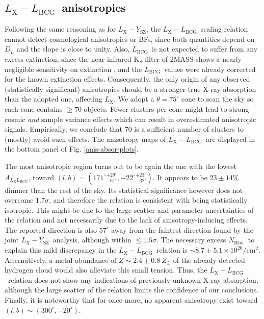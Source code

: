 \documentclass{aa}   %
\newcommand{\LY}{$L_{\text{X}}-Y_{\text{SZ}}$}
\newcommand{\LxLbcg}{$L_{\text{X}}-L_{\text{BCG}}$}
\newcommand{\Lx}{$L_{\text{X}}$}
\newcommand{\Lbcg}{$L_{\text{BCG}}$}
\newcommand{\nhtot}{$N_{\text{Htot}}$}
\begin{document}
\subsection{\LxLbcg\ anisotropies}\label{LxLbcg}

Following the same reasoning as for \LY, the \LxLbcg\ scaling relation cannot detect cosmological anisotropies or BFs, since both quantities depend on $D_L$ and the slope is close to unity. Also, \Lbcg\ is not expected to suffer from any excess extinction, since the near-infrared K$_{\text{S}}$ filter of 2MASS shows a nearly negligible sensitivity on extinction \citep{schlafly}, and the \Lbcg\ values were already corrected for the known extinction effects. Consequently, the only origin of any observed (statistically significant) anisotropies should be a stronger true X-ray absorption than the adopted one, affecting \Lx. We adopt a $\theta=75^{\circ}$ cone to scan the sky so each cone contains $\geq 70$ objects. Fewer clusters per cone might lead to strong cosmic \emph{and} sample variance effects which can result in overestimated anisotropic signals. Empirically, we conclude that 70 is a sufficient number of clusters to (mostly) avoid such effects. The anisotropy maps of \LxLbcg\ are displayed in the bottom panel of Fig. \ref{anis-absor-plots}. 

The most anisotropic region turns out to be again the one with the lowest $A_{L_{\text{X}}L_{\text{BCG}}}$, toward $(l,b)=({171^{\circ}}^{+29^{\circ}}_{-61^{\circ}},{-22^{\circ}}^{+23^{\circ}}_{-32^{\circ}})$. It appears to be $23\pm 14 \%$ dimmer than the rest of the sky. Its statistical significance however does not overcome $1.7\sigma$, and therefore the relation is consistent with being statistically isotropic. This might be due to the large scatter and parameter uncertainties of the relation and not necessarily due to the lack of anisotropy-inducing effects. The reported direction is also $57^{\circ}$ away from the faintest direction found by the joint \LY\ analysis, although within $\leq 1.5\sigma$. The necessary excess \nhtot\ to explain this mild discrepancy in the \LxLbcg\ relation is $\sim 8.7\pm 5.1\times 10^{20}/$cm$^2$. Alternatively, a metal abundance of $Z\sim 2.4\pm 0.8\ Z_{\odot}$ of the already-detected hydrogen cloud would also alleviate this small tension. Thus, the \LxLbcg\ relation does not show any indications of previously unknown X-ray absorption, although the large scatter of the relation limits the confidence of our conclusions. Finally, it is noteworthy that for once more, no apparent anisotropy exist toward $(l,b)\sim (300^{\circ},-20^{\circ})$.
\end{document}
